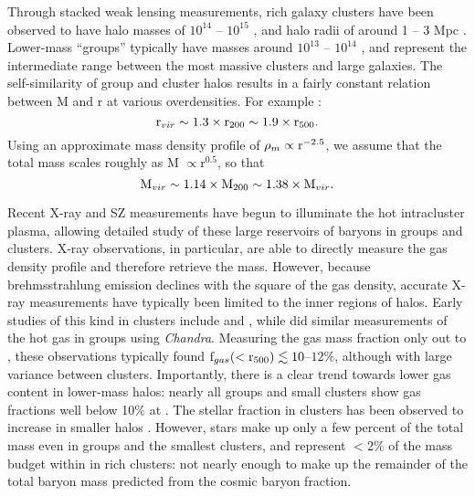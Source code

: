Through stacked weak lensing measurements, rich galaxy clusters have
been observed to have halo masses of $10^{14}$ -- $10^{15}$ \Msun{}
\citep{Mandelbaum2008}, and halo radii of around 1 -- 3 Mpc
\citep{Vikhlinin2006}. Lower-mass ``groups'' typically have masses
around $10^{13}$ -- $10^{14}$ \Msun{}, and represent the
intermediate range between the most massive clusters and large
galaxies. The self-similarity of group and cluster halos results in a
fairly constant relation between M and r at various overdensities. For
example \citep{Rasheed2011}:
\begin{equation}
\textrm{r\ensuremath{_{vir}}}{} \sim 1.3\times{}\textrm{r\ensuremath{_{200}}}{} \sim
1.9\times{}\textrm{r\ensuremath{_{500}}}{}.
\end{equation}
Using an approximate mass density profile of $\rho_m \propto
\textrm{r}^{-2.5}$, we assume that the total mass scales roughly as
M $\propto \textrm{r}^{0.5}$, so that
\begin{equation}
\textrm{M\ensuremath{_{vir}}}{} \sim 1.14\times{}\textrm{M\ensuremath{_{200}}}{} \sim 1.38 \times{}\textrm{M\ensuremath{_{vir}}}{}.
\end{equation}

Recent X-ray and SZ measurements have begun to illuminate the hot
intracluster plasma, allowing detailed study of these large reservoirs
of baryons in groups and clusters. X-ray observations, in particular,
are able to directly measure the gas density profile and therefore
retrieve the mass. However, because brehmsstrahlung emission declines
with the square of the gas density, accurate X-ray measurements have
typically been limited to the inner regions of halos. Early studies of
this kind in clusters include \citet[][with
  \textit{Chandra}]{Vikhlinin2006} and \citet[][with
  \textit{XMM-Newton}]{Arnaud2007}, while \citet{Sun2009} did similar
measurements of the hot gas in groups using
\textit{Chandra}. Measuring the gas mass fraction only out to
\rfive{}, these observations typically found
$\textrm{f\ensuremath{_{gas}}}{}(<\textrm{r\ensuremath{_{500}}}{}) \lesssim 10$--$12\%$, although with large
variance between clusters. Importantly, there is a clear trend towards
lower gas content in lower-mass halos: nearly all groups and small
clusters show gas fractions well below 10$\%{}$ at
\rfive{}.  The
stellar fraction in clusters has been observed to increase in smaller
halos \citep{Giodini2009, Bahcall2014}. However, stars make up only a
few percent of the total mass even in groups and the smallest
clusters, and represent $<2\%$ of the mass budget within \rfive{} in
rich clusters: not nearly enough to make up the remainder of the
total baryon mass predicted from the cosmic baryon fraction.

